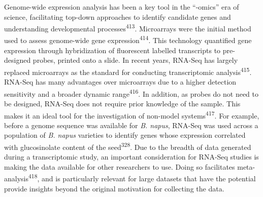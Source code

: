 \documentclass[12pt,]{book}
\begin{document}
Genome-wide expression analysis has been a key tool in the ``-omics''
era of science, facilitating top-down approaches to identify candidate
genes and understanding developmental processes\textsuperscript{413}.
Microarrays were the initial method used to assess genome-wide gene
expression\textsuperscript{414}. This technology quantified gene
expression through hybridization of fluorescent labelled transcripts to
pre-designed probes, printed onto a slide. In recent years, RNA-Seq has
largely replaced microarrays as the standard for conducting
transcriptomic analysis\textsuperscript{415}. RNA-Seq has many
advantages over microarrays due to a higher detection sensitivity and a
broader dynamic range\textsuperscript{416}. In addition, as probes do
not need to be designed, RNA-Seq does not require prior knowledge of the
sample. This makes it an ideal tool for the investigation of non-model
systems\textsuperscript{417}. For example, before a genome sequence was
available for \emph{B. napus}, RNA-Seq was used across a population of
\emph{B. napus} varieties to identify genes whose expression correlated
with glucosinolate content of the seed\textsuperscript{328}. Due to the
breadth of data generated during a transcriptomic study, an important
consideration for RNA-Seq studies is making the data available for other
researchers to use. Doing so facilitates
meta-analysis\textsuperscript{418}, and is particularly relevant for
large datasets that have the potential provide insights beyond the
original motivation for collecting the data.
\end{document}
